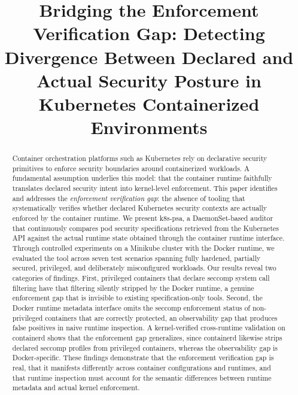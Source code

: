 \documentclass[conference]{IEEEtran}
\begin{document}
\title{Bridging the Enforcement Verification Gap: Detecting Divergence Between Declared and Actual Security Posture in Kubernetes Containerized Environments}

\author{
}

\maketitle

\begin{abstract}
Container orchestration platforms such as Kubernetes rely on declarative security primitives to enforce security boundaries around containerized workloads. A fundamental assumption underlies this model: that the container runtime faithfully translates declared security intent into kernel-level enforcement. This paper identifies and addresses the \emph{enforcement verification gap}: the absence of tooling that systematically verifies whether declared Kubernetes security contexts are actually enforced by the container runtime. We present k8s-psa, a DaemonSet-based auditor that continuously compares pod security specifications retrieved from the Kubernetes API against the actual runtime state obtained through the container runtime interface. Through controlled experiments on a Minikube cluster with the Docker runtime, we evaluated the tool across seven test scenarios spanning fully hardened, partially secured, privileged, and deliberately misconfigured workloads. Our results reveal two categories of findings. First, privileged containers that declare seccomp system call filtering have that filtering silently stripped by the Docker runtime, a genuine enforcement gap that is invisible to existing specification-only tools. Second, the Docker runtime metadata interface omits the seccomp enforcement status of non-privileged containers that are correctly protected, an observability gap that produces false positives in naive runtime inspection. A kernel-verified cross-runtime validation on containerd shows that the enforcement gap generalizes, since containerd likewise strips declared seccomp profiles from privileged containers, whereas the observability gap is Docker-specific. These findings demonstrate that the enforcement verification gap is real, that it manifests differently across container configurations and runtimes, and that runtime inspection must account for the semantic differences between runtime metadata and actual kernel enforcement.
\end{abstract}
\end{document}
